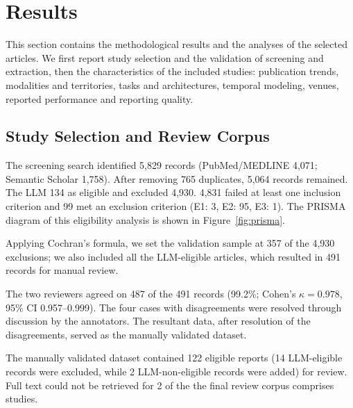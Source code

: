 \section{Results}
\label{sec:analysis}
\label{sec:results}
This section contains the methodological results and the analyses of the selected articles. We first report study selection and the validation of screening and extraction, then the characteristics of the  included studies: publication trends, modalities and territories, tasks and architectures, temporal modeling, venues, reported performance and reporting quality.

\subsection{Study Selection and Review Corpus}
The screening search identified 5,829 records (PubMed/\allowbreak MEDLINE 4,071; Semantic Scholar 1,758). After removing 765 duplicates, 5,064 records remained. The LLM  134 as eligible and excluded 4,930. 4,831 failed at least one inclusion criterion and 99 met an exclusion criterion (E1: 3, E2: 95, E3: 1). The PRISMA diagram of this eligibility analysis is shown in Figure~\ref{fig:prisma}.

Applying Cochran's \cite{cochran1977sampling} formula, we set the validation sample at 357 of the 4,930 exclusions; we also included all the LLM-eligible articles, which resulted in 491 records for manual review.

The two reviewers agreed on 487 of the 491 records (99.2\%; Cohen's $\kappa=0.978$, 95\% CI 0.957--0.999). The four cases with disagreements were resolved through discussion by the annotators. The resultant data, after resolution of the disagreements, served as the manually validated dataset.

The manually validated dataset contained 122 eligible reports (14 LLM-eligible records were excluded, while 2 LLM-non-eligible records were added) for review. Full text could not be retrieved for 2 of  the   the  final review corpus  comprises  studies. 

